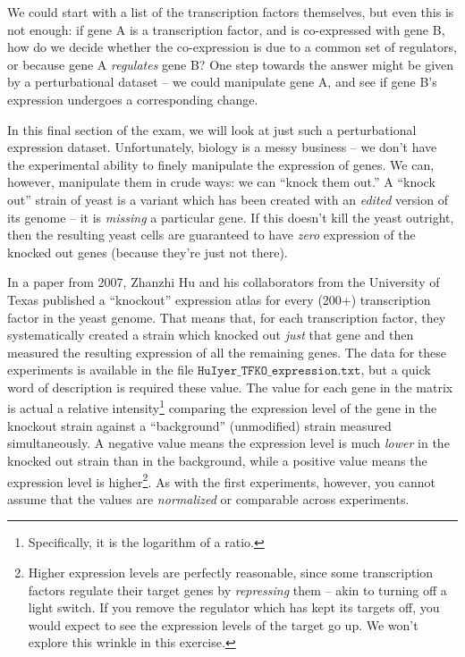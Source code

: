 \documentclass{article}
\newcommand{\rcode}[1]{\ensuremath{\mathtt{#1}}}
\begin{document}
We could start with a list of the transcription factors themselves, but even this is not enough: if gene A is a transcription factor, and is co-expressed with gene B, how do we decide whether the co-expression is due to a common set of regulators, or because gene A \emph{regulates} gene B?  
One step towards the answer might be given by a perturbational dataset -- we could manipulate gene A, and see if gene B's expression undergoes a corresponding change.  

In this final section of the exam, we will look at just such a perturbational expression dataset.  
Unfortunately, biology is a messy business -- we don't have the experimental ability to finely manipulate the expression of genes.  
We can, however, manipulate them in crude ways: we can ``knock them out.'' 
A ``knock out'' strain of yeast is a variant which has been created with an \emph{edited} version of its genome -- it is \emph{missing} a particular gene.  
If this doesn't kill the yeast outright, then the resulting yeast cells are guaranteed to have \emph{zero} expression of the knocked out genes (because they're just not there).  

In a paper from 2007, Zhanzhi Hu and his collaborators from the University of Texas published a ``knockout'' expression atlas for every (200+) transcription factor in the yeast genome.  
That means that, for each transcription factor, they systematically created a strain which knocked out \emph{just} that gene and then measured the resulting expression of all the remaining genes.  
The data for these experiments is available in the file \rcode{HuIyer\_TFKO\_expression.txt}, but a quick word of description is required these value.  
The value for each gene in the matrix is actual a relative intensity\footnote{Specifically, it is the logarithm of a ratio.} comparing the expression level of the gene in the knockout strain against a ``background'' (unmodified) strain measured simultaneously.  
A negative value means the expression level is much \emph{lower} in the knocked out strain than in the background, while a positive value means the expression level is higher\footnote{Higher expression levels are perfectly reasonable, since some transcription factors regulate their target genes by \emph{repressing} them -- akin to turning off a light switch.  If you remove the regulator which has kept its targets off, you would expect to see the expression levels of the target go up.  We won't explore this wrinkle in this exercise.}.  
As with the first experiments, however, you cannot assume that the values are \emph{normalized} or comparable across experiments.  
\end{document}
